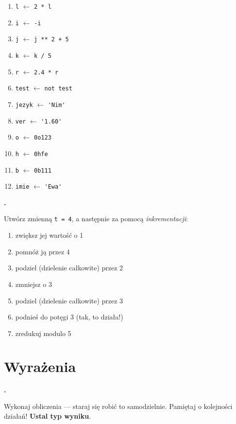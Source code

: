 \documentclass[a4paper]{article}
\begin{document}
\begin{multicols}{2}
\begin{enumerate}[label=\arabic*.]
    \item \verb|l| $\leftarrow$ \verb|2 * l|
    \item \verb|i| $\leftarrow$ \verb|-i|
    \item \verb|j| $\leftarrow$ \verb|j ** 2 + 5|
    \item \verb|k| $\leftarrow$ \verb|k / 5|
    \item \verb|r| $\leftarrow$ \verb|2.4 * r|
    \item \verb|test| $\leftarrow$ \verb|not test|
    \item \verb|jezyk| $\leftarrow$ \verb|'Nim'|
    \item \verb|ver| $\leftarrow$ \verb|'1.60'|
    \item \verb|o| $\leftarrow$ \verb|0o123|
    \item \verb|h| $\leftarrow$ \verb|0hfe|
    \item \verb|b| $\leftarrow$ \verb|0b111|
    \item \verb|imie| $\leftarrow$ \verb|'Ewa'|
\end{enumerate}
\end{multicols}

\textbf{.}\addtocounter{zadanie}{1} Utwórz zmienną \verb|t = 4|, a następnie za pomocą \emph{inkrementacji}:

\begin{enumerate}[label=\arabic*.]
    \item zwiększ jej wartość o 1
    \item pomnóż ją przez 4
    \item podziel (dzielenie całkowite) przez 2
    \item zmniejsz o 3
    \item podziel (dzielenie całkowite) przez 3
    \item podnieś do potęgi 3 (tak, to działa!)
    \item zredukuj modulo 5
\end{enumerate}


\section{Wyrażenia}

\textbf{.}\addtocounter{zadanie}{1} Wykonaj obliczenia --- staraj się robić to samodzielnie. Pamiętaj o kolejności działań! \textbf{Ustal typ wyniku}.
\end{document}
